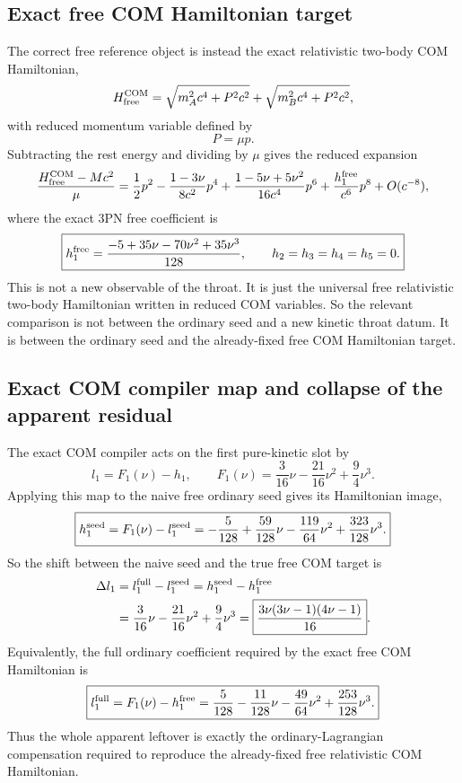 \documentclass[11pt]{article}
\begin{document}
\subsection{Exact free COM Hamiltonian target}
\label{app:pure_kinetic_collapse_derivation:free_com_target}

The correct free reference object is instead the exact relativistic two-body COM Hamiltonian,
\[
H_{\rm free}^{\rm COM}
=
\sqrt{m_A^2c^4+P^2c^2}
+
\sqrt{m_B^2c^4+P^2c^2},
\]
with reduced momentum variable defined by
\[
P=\mu p.
\]
Subtracting the rest energy and dividing by $\mu$ gives the reduced expansion
\[
\frac{H_{\rm free}^{\rm COM}-Mc^2}{\mu}
=
\frac12p^2
-
\frac{1-3\nu}{8c^2}p^4
+
\frac{1-5\nu+5\nu^2}{16c^4}p^6
+
\frac{h_1^{\rm free}}{c^6}p^8
+O(c^{-8}),
\]
where the exact $3$PN free coefficient is
\[
\boxed{
 h_1^{\rm free}
 =
 \frac{-5+35\nu-70\nu^2+35\nu^3}{128},
 \qquad
 h_2=h_3=h_4=h_5=0.
}
\]
This is not a new observable of the throat. It is just the universal free relativistic two-body Hamiltonian written in reduced COM variables. So the relevant comparison is not between the ordinary seed and a new kinetic throat datum. It is between the ordinary seed and the already-fixed free COM Hamiltonian target.

\subsection{Exact COM compiler map and collapse of the apparent residual}
\label{app:pure_kinetic_collapse_derivation:compiler_collapse}

The exact COM compiler acts on the first pure-kinetic slot by
\[
\boxed{
 l_1=F_1(\nu)-h_1,
 \qquad
 F_1(\nu)=\frac{3}{16}\nu-\frac{21}{16}\nu^2+\frac94\nu^3.
}
\]
Applying this map to the naive free ordinary seed gives its Hamiltonian image,
\[
\boxed{
 h_1^{\rm seed}
 =
 F_1(\nu)-l_1^{\rm seed}
 =
 -\frac{5}{128}+\frac{59}{128}\nu-\frac{119}{64}\nu^2+\frac{323}{128}\nu^3.
}
\]
So the shift between the naive seed and the true free COM target is
\[
\begin{aligned}
\Delta l_1
&=
 l_1^{\rm full}-l_1^{\rm seed}
=
 h_1^{\rm seed}-h_1^{\rm free}
\\
&=
\frac{3}{16}\nu-\frac{21}{16}\nu^2+\frac94\nu^3
=
\boxed{\frac{3\nu(3\nu-1)(4\nu-1)}{16}}.
\end{aligned}
\]
Equivalently, the full ordinary coefficient required by the exact free COM Hamiltonian is
\[
\boxed{
 l_1^{\rm full}
 =
 F_1(\nu)-h_1^{\rm free}
 =
 \frac{5}{128}-\frac{11}{128}\nu-\frac{49}{64}\nu^2+\frac{253}{128}\nu^3.
}
\]
Thus the whole apparent leftover is exactly the ordinary-Lagrangian compensation required to reproduce the already-fixed free relativistic COM Hamiltonian.
\end{document}
